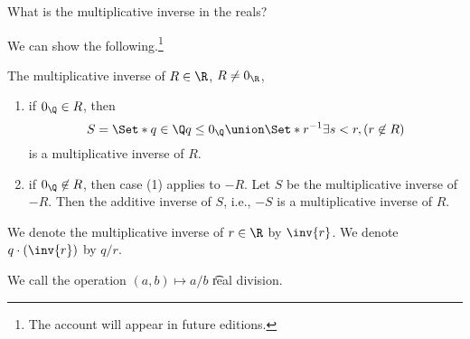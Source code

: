 

What is the multiplicative inverse in the reals?


We can show the following.\footnote{The account will appear in future editions.}

\begin{proposition}
  The multiplicative inverse of $R \in \R$, $R \neq 0_{\R}$,
	\begin{enumerate}
		\item if $0_{\Q} \in R$, then 
		\[S = \Set*{q \in \Q}{q \leq 0_{\Q}} \union \Set*{r^{-1}}{\exists s < r, (r \not\in R)} \]
		is a multiplicative inverse of $R$.
		
		\item if $0_{\Q} \not\in R$, then case (1) applies to $-R$. Let $S$ be the multiplicative inverse of $-R$. Then  the additive inverse of $S$, i.e., $-S$ is a multiplicative inverse of $R$.
	\end{enumerate}
\end{proposition}


We denote the multiplicative inverse of $r \in \R$ by $\inv{r}$.
We denote $q \cdot (\inv{r})$ by $q/r$.


We call the operation $(a, b) \mapsto a/b$ \t{real division}.

\blankpage

